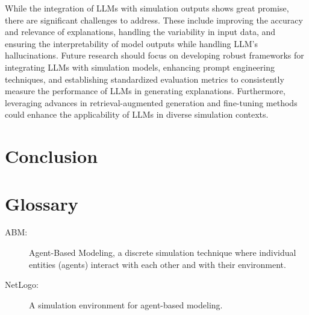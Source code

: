 \documentclass[preprint,12pt]{elsarticle}
\begin{document}
While the integration of LLMs with simulation outputs shows great promise, there are significant challenges to address. These include improving the accuracy and relevance of explanations, handling the variability in input data, and ensuring the interpretability of model outputs while handling LLM's hallucinations. Future research should focus on developing robust frameworks for integrating LLMs with simulation models, enhancing prompt engineering techniques, and establishing standardized evaluation metrics to consistently measure the performance of LLMs in generating explanations. Furthermore, leveraging advances in retrieval-augmented generation and fine-tuning methods could enhance the applicability of LLMs in diverse simulation contexts.

\section{Conclusion}
\label{sec6}

\newpage

\section{Glossary}
\label{glossary}

\begin{description}
    \item[ABM:] Agent-Based Modeling, a discrete simulation technique where individual entities (agents) interact with each other and with their environment.
    \item[NetLogo:] A simulation environment for agent-based modeling.
\end{description}








\end{document}
